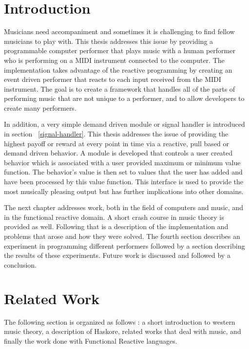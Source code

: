 \documentclass[12pt]{ucthesis}
\begin{document}
\pagestyle{plain}

\renewcommand{\baselinestretch}{1.66}


\chapter{Introduction}
\label{intro}

Musicians need accompaniment and sometimes it is challenging to find fellow musicians to play with. This thesis addresses this issue by providing a programmable computer performer that plays music with a human performer who is performing on a MIDI instrument connected to the computer. The implementation takes advantage of the reactive programming by creating an event driven performer that reacts to each input received from the MIDI instrument. The goal is to create a framework that handles all of the parts of performing music that are not unique to a performer, and to allow developers to create many performers. 

In addition, a very simple demand driven module or signal handler is introduced in section ~\ref{signal-handler}. This thesis addresses the issue of providing the highest payoff or reward at every point in time via a reactive, pull based or demand driven behavior. A module is developed that controls a user created behavior which is associated with a user provided maximum or minimum value function. The behavior's value is then set to values that the user has added and have been processed by this value function. This interface is used to provide the most musically pleasing output but has further implications into other domains. 

The next chapter addresses work, both in the field of computers and music, and in the functional reactive domain. A short crash course in music theory is provided as well. Following that is a description of the implementation and problems that arose and how they were solved. The fourth section describes an experiment in programming different performers followed by a section describing the results of these experiments. Future work is discussed and followed by a conclusion.

\chapter{Related Work}
\label{rw}

The following section is organized as follows : a short introduction to western music theory, a description of Haskore, related works that deal with music, and finally the work done with Functional Reactive languages.
\end{document}
